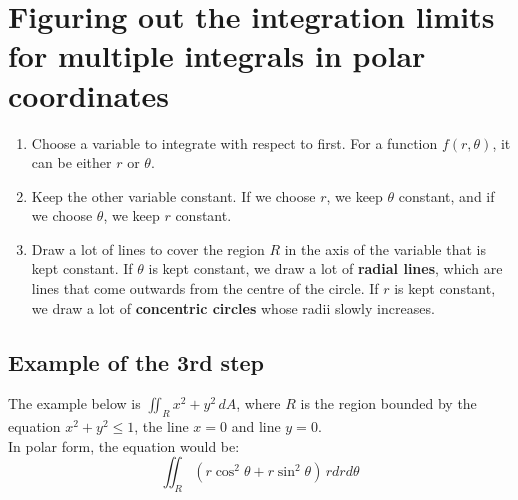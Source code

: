 \documentclass[11pt]{article}
\begin{document}
\section{Figuring out the integration limits for multiple integrals in polar coordinates}
\label{sec:orgbbb0872}
\begin{enumerate}
\item Choose a variable to integrate with respect to first. For a function \(f(r, \theta)\), it can be either \(r\) or \(\theta\).
\item Keep the other variable constant. If we choose \(r\), we keep \(\theta\) constant, and if we choose \(\theta\), we keep \(r\) constant.
\item Draw a lot of lines to cover the region \(R\) in the axis of the variable that is kept constant. If \(\theta\) is kept constant, we draw a lot of \textbf{radial lines}, which are lines that come outwards from the centre of the circle. If \(r\) is kept constant, we draw a lot of \textbf{concentric circles} whose radii slowly increases.
\end{enumerate}
\subsection{Example of the 3rd step}
\label{sec:org7598067}
The example below is \(\iint_R x^2 + y^2 \, dA\), where \(R\) is the region bounded by the equation \(x^2 + y^2 \le 1\), the line \(x = 0\) and line \(y = 0\).  \\

In polar form, the equation would be:
\[\iint_R (r \cos^2 \theta + r \sin^2 \theta) \, r dr d \theta\]
\end{document}
